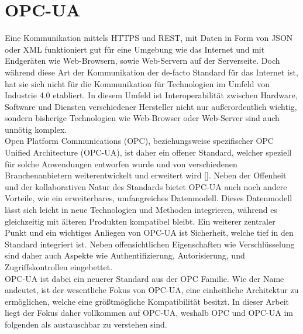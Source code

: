 \section{OPC-UA}
\label{sec:opcua}

Eine Kommunikation mittels HTTPS und REST, mit Daten in Form von JSON oder XML funktioniert gut für eine Umgebung wie das Internet und mit Endgeräten wie Web-Browsern, sowie Web-Servern auf der Serverseite. Doch während diese Art der Kommunikation der de-facto Standard für das Internet ist, hat sie sich nicht für die Kommunikation für Technologien im Umfeld von Industrie 4.0 etabliert. In diesem Umfeld ist Interoperabilität zwischen Hardware, Software und Diensten verschiedener Hersteller nicht nur außerordentlich wichtig, sondern bisherige Technologien wie Web-Browser oder Web-Server sind auch unnötig komplex.\\
Open Platform Communications (OPC), beziehungsweise spezifischer OPC Unified Architecture (OPC-UA), ist daher ein offener Standard, welcher speziell für solche Anwendungen entworfen wurde und von verschiedenen Branchenanbietern weiterentwickelt und erweitert wird [\cite{opcua}]. Neben der Offenheit und der kollaborativen Natur des Standards bietet OPC-UA auch noch andere Vorteile, wie ein erweiterbares, umfangreiches Datenmodell. Dieses Datenmodell lässt sich leicht in neue Technologien und Methoden integrieren, während es gleichzeitig mit älteren Produkten kompatibel bleibt. Ein weiterer zentraler Punkt und ein wichtiges Anliegen von OPC-UA ist Sicherheit, welche tief in den Standard integriert ist. Neben offensichtlichen Eigenschaften wie Verschlüsselung sind daher auch Aspekte wie Authentifizierung, Autorisierung, und Zugriffskontrollen eingebettet.\\
OPC-UA ist dabei ein neuerer Standard aus der OPC Familie. Wie der Name andeutet, ist der wesentliche Fokus von OPC-UA, eine einheitliche Architektur zu ermöglichen, welche eine größtmögliche Kompatibilität besitzt. In dieser Arbeit liegt der Fokus daher vollkommen auf OPC-UA, weshalb OPC und OPC-UA im folgenden als austauschbar zu verstehen sind.

